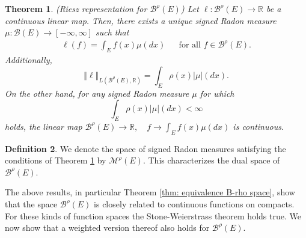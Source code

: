 \documentclass[a4paper,12pt]{article}
\newtheorem{theorem}{Theorem}[section]
\theoremstyle{definition}
\newtheorem{definition}[theorem]{Definition}
\theoremstyle{remark}
\numberwithin{equation}{section}
\numberwithin{theorem}{section}
\begin{document}
\begin{theorem}
(Riesz representation for $\mathcal{\mathscr{B}}^{\rho}(E)$) \label{thm:Riesz-representation-for B rho}
Let $\ell:\mathcal{\mathscr{B}}^{\rho}(E)\rightarrow\mathbb{R}$ be
a continuous linear map. Then, there exists a unique
signed Radon measure $\mu: \mathcal{B}(E) \to [-\infty, \infty]$ such that
\begin{eqnarray}
\ell(f)=\int_{E}f(x)\mu(dx) & & \text{for all }f\in\mathcal{\mathscr{B}}^{\rho}(E).\label{eq:functional b-rho}
\end{eqnarray}
Additionally, 
\[
\left\Vert \ell\right\Vert _{L\left(\mathcal{\mathscr{B}}^{\rho}(E),\mathbb{R}\right)}=\int_{E}\rho(x)\left|\mu\right|(dx).
\]
On the other hand, for any signed Radon measure $\mu$ for which
\[
\int_{E}\rho(x)\left|\mu\right|(dx) < \infty
\]
holds, the linear map
$
\mathcal{\mathscr{B}}^{\rho}(E)  \rightarrow\mathbb{R}, \quad 
f \rightarrow\int_{E}f(x)\mu(dx)
$
is  continuous.
\end{theorem}


\begin{definition}
We denote the space of signed Radon measures satisfying the conditions of Theorem \ref{thm:Riesz-representation-for B rho} by  $\mathcal{M}^{\rho}(E)$. This characterizes the dual space of $\mathcal{\mathscr{B}}^{\rho}(E)$.
\end{definition}


The above results, in particular Theorem \ref{thm: equivalence B-rho space}, show that the space $\mathcal{\mathscr{B}}^{\rho}(E)$
is closely related to  continuous functions on  compacts.
For these kinds of function spaces the Stone-Weierstrass theorem holds true. We now show that a weighted version thereof also holds for $\mathcal{\mathscr{B}}^{\rho}(E).$
\end{document}
